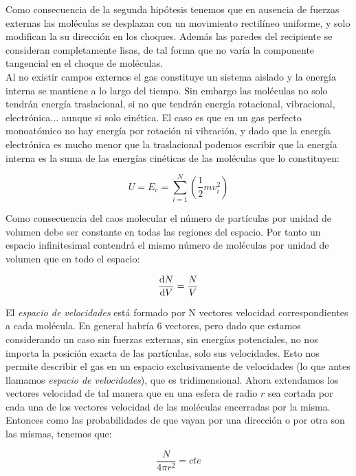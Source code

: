 \documentclass[12pt]{book}
\begin{document}
Como consecuencia de la segunda hipótesis tenemos que en ausencia de fuerzas externas las moléculas se desplazan con un movimiento rectilíneo uniforme, y solo modifican la su dirección en los choques. Además las paredes del recipiente se consideran completamente lisas, de tal forma que no varía la componente tangencial en el choque de moléculas. \\

Al no existir campos externos el gas constituye un sistema aislado y la energía interna se mantiene a lo largo del tiempo. Sin embargo las moléculas no solo tendrán energía traslacional, si no que tendrán energía rotacional, vibracional, electrónica... aunque si solo cinética. El caso es que en un gas perfecto monoatómico no hay energía por rotación ni vibración, y dado que la energía electrónica es mucho menor que la traslacional podemos escribir que la energía interna es la suma de las energías cinéticas de las moléculas que lo constituyen:

\begin{equation}
U = E_c = \sum_{i=1}^N \left( \dfrac{1}{2} m v_i^2 \right)
\end{equation}

Como consecuencia del caos molecular el número de partículas por unidad de volumen debe ser constante en todas las regiones del espacio. Por tanto un espacio infinitesimal contendrá el mismo número de moléculas por unidad de volumen que en todo el espacio:

\begin{equation}
\dfrac{\mathrm{d} N}{\mathrm{d} V} = \dfrac{N}{V}
\end{equation}

El \textit{espacio de velocidades} está formado por N vectores velocidad correspondientes a cada molécula. En general habría 6 vectores, pero dado que estamos considerando un caso sin fuerzas externas, sin energías potenciales, no nos importa la posición exacta de las partículas, solo sus velocidades. Esto nos permite describir el gas en un espacio exclusivamente de velocidades (lo que antes llamamos \textit{espacio de velocidades}), que es tridimensional. Ahora extendamos los vectores velocidad de tal manera que en una esfera de radio $r$ sea cortada por cada una de los vectores velocidad de las moléculas encerradas por la misma. Entonces como las probabilidades de que vayan por una dirección o por otra son las mismas, tenemos que:


\begin{equation}
\dfrac{N}{4 \pi r^2} = cte
\end{equation}
\end{document}
